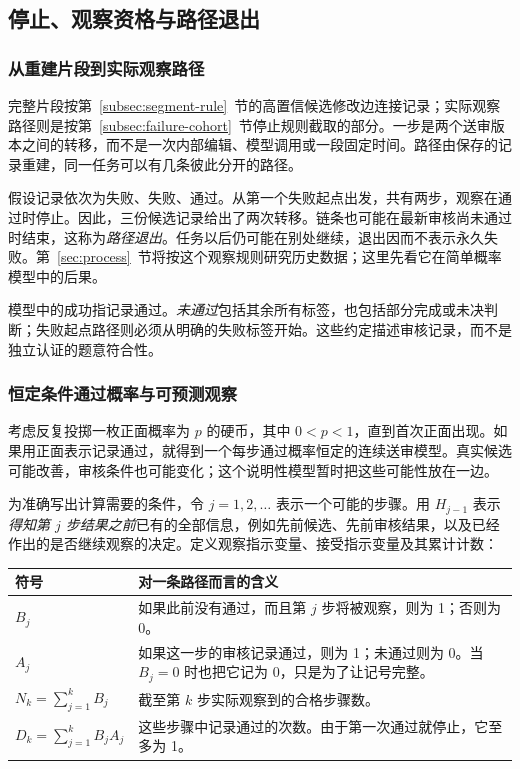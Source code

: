 \subsection{停止、观察资格与路径退出}
\label{sec:process-theory}

\subsubsection{从重建片段到实际观察路径}
完整片段按第~\ref{subsec:segment-rule}~节的高置信候选修改边连接记录；实际观察路径则是按第~\ref{subsec:failure-cohort}~节停止规则截取的部分。一步是两个送审版本之间的转移，而不是一次内部编辑、模型调用或一段固定时间。路径由保存的记录重建，同一任务可以有几条彼此分开的路径。

假设记录依次为失败、失败、通过。从第一个失败起点出发，共有两步，观察在通过时停止。因此，三份候选记录给出了两次转移。链条也可能在最新审核尚未通过时结束，这称为\emph{路径退出}。任务以后仍可能在别处继续，退出因而不表示永久失败。第~\ref{sec:process}~节将按这个观察规则研究历史数据；这里先看它在简单概率模型中的后果。

模型中的成功指记录通过。\emph{未通过}包括其余所有标签，也包括部分完成或未决判断；失败起点路径则必须从明确的失败标签开始。这些约定描述审核记录，而不是独立认证的题意符合性。

\subsubsection{恒定条件通过概率与可预测观察}
考虑反复投掷一枚正面概率为 $p$ 的硬币，其中 $0<p<1$，直到首次正面出现。如果用正面表示记录通过，就得到一个每步通过概率恒定的连续送审模型。真实候选可能改善，审核条件也可能变化；这个说明性模型暂时把这些可能性放在一边。

为准确写出计算需要的条件，令 $j=1,2,\ldots$ 表示一个可能的步骤。用 $H_{j-1}$ 表示\emph{得知第 $j$ 步结果之前}已有的全部信息，例如先前候选、先前审核结果，以及已经作出的是否继续观察的决定。定义观察指示变量、接受指示变量及其累计计数：
\begin{center}
\begin{tabularx}{\linewidth}{lY}
\toprule
符号 & 对一条路径而言的含义 \\
\midrule
$B_j$ & 如果此前没有通过，而且第 $j$ 步将被观察，则为 1；否则为 0。 \\
$A_j$ & 如果这一步的审核记录通过，则为 1；未通过则为 0。当 $B_j=0$ 时也把它记为 0，只是为了让记号完整。 \\
$N_k=\sum_{j=1}^k B_j$ & 截至第 $k$ 步实际观察到的合格步骤数。 \\
$D_k=\sum_{j=1}^k B_jA_j$ & 这些步骤中记录通过的次数。由于第一次通过就停止，它至多为 1。 \\
\bottomrule
\end{tabularx}
\end{center}

